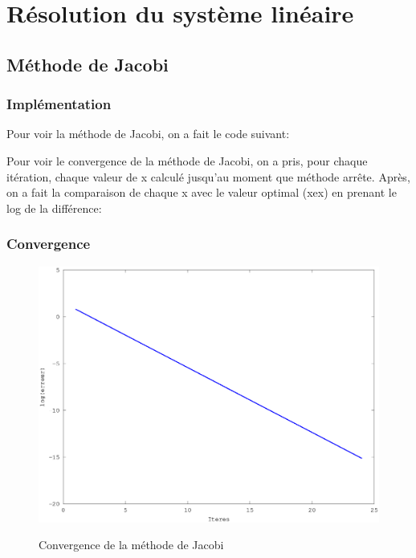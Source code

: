 \documentclass[a4paper,11pt]{article}
\begin{document}
\titleTMB 
\newpage
\tableofcontents
\newpage

\section{Résolution du système linéaire}

\subsection{Méthode de Jacobi}
\subsubsection{Implémentation}

Pour voir la méthode de Jacobi, on a fait le code suivant:

\begin{multicols}{2}
  
\end{multicols}

\newpage

Pour  voir le  convergence  de la  méthode de  Jacobi,  on a  pris, pour  chaque
itération, chaque valeur de x
calculé jusqu'au moment que méthode arrête. Après, on a fait la comparaison de
chaque x avec le valeur optimal (xex) en prenant le log de la différence:

\subsubsection{Convergence}
\begin{figure}[h!]
  \begin{centering}
    \includegraphics[scale=0.5]{../jacobi_graph}
    \label{rspro2}
    \par\end{centering}
  \caption{Convergence de la méthode de Jacobi}
  \label{fig:jacobi-conv}
\end{figure}
\end{document}
